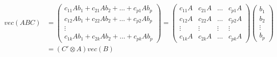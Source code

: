 \documentclass[a4paper]{scrartcl}
\begin{document}
\begin{enumerate}
\begin{solution}
		\begin{align*}
		vec(ABC) &= \begin{pmatrix} c_{11}A b_1 +c_{21}A b_2+\dots+ c_{p1}A b_p\\ c_{12}A b_1+c_{22} A b_2 + \dots +  c_{p2} A b_p \\ \vdots \\ c_{1k}A b_1+ c_{2k} A b_2 +\dots+ c_{pk} A b_p  \end{pmatrix}
		= \begin{pmatrix} c_{11}A &  c_{21}A  & \dots & c_{p1}A \\ c_{12}A  & c_{22} A & \dots & c_{p2} A\\ \vdots & \vdots &\vdots&\vdots \\ c_{1k}A & c_{2k} A &\dots& c_{pk} A  \end{pmatrix} \begin{pmatrix} b_1\\b_2\\ \vdots\\b_p\end{pmatrix}\\
		&= \left(C'\otimes A\right) vec(B)
		\end{align*}
	
	\end{solution}


\end{enumerate}
\end{document}
